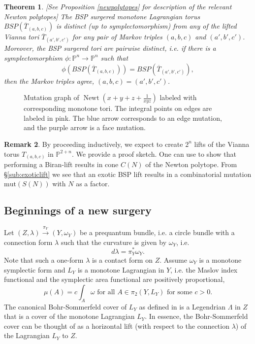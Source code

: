 \documentclass[11pt, oneside,dvipsnames]{amsart}
\newcommand{\incfig}[2]{
   
        \def\svgscale{#1}
    {#2.pdf_tex}
      
      
  
 }
\renewcommand{\to}{\rightarrow}
\renewcommand{\to}{\rightarrow}
\newcommand{\<}{\langle}
\renewcommand{\>}{\rangle}
\newcommand{\bP}{\mathbb{P}}
\renewcommand{\to}{\rightarrow}
\DeclareMathOperator{\newt}{Newt}
\newcommand{\abc}{{(a,b,c)}}
\newtheorem{Theorem}{Theorem}[section]
\theoremstyle{definition}
\theoremstyle{definition}
\newtheorem{remark}[Theorem]{Remark}
\numberwithin{equation}{subsection}
\begin{document}
\begin{Theorem}\label{morevianna}[See Proposition \ref{newpolytopes} for description of the relevant Newton polytopes]
   The BSP surgered monotone Lagrangian torus $BSP(\overline{T}_{(a,b,c)})$ is distinct (up to symplectomorphism) from any of the lifted  Vianna tori $\overline{T}_{(a',b',c')}$ for any  pair of Markov triples $(a,b,c)$ and $(a',b',c')$. Moreover, the BSP surgered tori are pairwise distinct, i.e. if there is a symplectomorphism $\phi: \bP^n \to \bP^n$ such that $$\phi(BSP(\overline{T}_{(a,b,c)})) = BSP(\overline{T}_{(a',b',c')}), $$  then the Markov triples agree, $(a,b,c) = (a',b',c')$.
\end{Theorem}
    


\begin{figure}[ht]
    \makebox[\textwidth][c]{\incfig{0.8}{polytopegraph}}
    \caption{Mutation graph of $\newt(x+y+z+\frac{1}{xyz})$ labeled with corresponding monotone tori. The integral points on edges are labeled in pink. The blue arrow corresponds to an edge mutation, and the purple arrow is a face mutation.}
    \label{fig:newts}
\end{figure}



\begin{remark}

     
By proceeding inductively, we expect to create $2^n$ lifts of the Vianna torus $T_\abc$ in $\bP^{2+n}$. We provide a proof sketch. One can use \cite{DTVW,bk13} to show that performing a Biran-lift results in cone $C(N)$ of the Newton polytope. From \S \ref{sub:exoticlift} we see that an exotic BSP lift results in a combinatorial mutation $\text{mut}(S(N))$ with $N$ as a factor.   
\end{remark}



\subsection{Beginnings of a new surgery}
Let $(Z,\lambda) \xrightarrow{\pi_Y} (Y,\omega_Y)$ be a prequantum bundle, i.e. a circle bundle with a connection form $\lambda$ such that the curvature is given by $\omega_Y$, i.e. $$d\lambda = \pi_Y^* \omega_Y.$$ Note that such a one-form $\lambda$ is a contact form on $Z$. Assume $\omega_Y$ is a monotone symplectic form and $L_Y$ is a monotone Lagrangian in $Y$, i.e. the Maslov index functional and the symplectic area functional are positively proportional, $$\mu(A) = c\int _A\omega \text{ for all } A\in \pi_2(Y,L_Y) \text{ for some } c>0.$$
The canonical Bohr-Sommerfeld cover of $L_Y$ as defined in \cite[\S 4]{rg19} is a Legendrian $\Lambda$ in $Z$ that is a cover of the monotone Lagrangian $L_Y$.  In essence, the Bohr-Sommerfeld cover can be thought of as a horizontal lift (with respect to the connection $\lambda$) of the Lagrangian $L_Y$ to $Z$.
\end{document}

